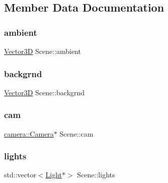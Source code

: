 \subsection{Member Data Documentation}
\mbox{\label{classScene_a284ce5b2aeb47c64d6712d9748229c47}} 
\subsubsection{\texorpdfstring{ambient}{ambient}}
{\footnotesize\ttfamily \mbox{\hyperlink{classVector3D}{Vector3D}} Scene\+::ambient\hspace{0.3cm}{\ttfamily [private]}}

\mbox{\label{classScene_ac745fba97d639cebcf0e8fbf59967da2}} 
\subsubsection{\texorpdfstring{backgrnd}{backgrnd}}
{\footnotesize\ttfamily \mbox{\hyperlink{classVector3D}{Vector3D}} Scene\+::backgrnd\hspace{0.3cm}{\ttfamily [private]}}

\mbox{\label{classScene_a3e5448bc1b1150aa67049914b7800b63}} 
\subsubsection{\texorpdfstring{cam}{cam}}
{\footnotesize\ttfamily \mbox{\hyperlink{classcamera_1_1Camera}{camera\+::\+Camera}}$\ast$ Scene\+::cam\hspace{0.3cm}{\ttfamily [private]}}

\mbox{\label{classScene_a4ecc3182a80435e1c4dfbe1b20e559bd}} 
\subsubsection{\texorpdfstring{lights}{lights}}
{\footnotesize\ttfamily std\+::vector$<$\mbox{\hyperlink{classLight}{Light}}$\ast$$>$ Scene\+::lights\hspace{0.3cm}{\ttfamily [private]}}

